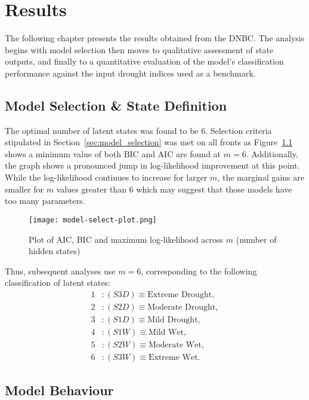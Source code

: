 \graphicspath{{results/fig/}}

\chapter{Results}
\label{chap:results}

The following chapter presents the results obtained from the DNBC. The analysis begins with model selection then moves to qualitative assessment of state outputs, and finally to a quantitative evaluation of the model’s classification performance against the input drought indices used as a benchmark.

\section{Model Selection \& State Definition}

The optimal number of latent states was found to be $6$. Selection criteria stipulated in Section~\ref{sec:model_selection} was met on all fronts as Figure~\ref{fig:model-select-plot} shows a minimum value of both BIC and AIC are found at $m=6$. Additionally, the graph shows a pronounced jump in log-likelihood improvement at this point. While the log-likelihood continues to increase for larger $m$, the marginal gains are smaller for $m$ values greater than $6$ which may suggest that those models have too many parameters. 

\begin{figure}[!h]
    \centering
    \texttt{[image: model-select-plot.png]}
    \caption[Model Selection Plot]{Plot of AIC, BIC and maximum log-likelihood across $m$ (number of hidden states)}
    \label{fig:model-select-plot}
\end{figure}

Thus, subsequent analyses use $m = 6$, corresponding to the following classification of latent states:
\[
\begin{aligned}
1 &: (S3D) \equiv \text{Extreme Drought}, \\
2 &: (S2D) \equiv \text{Moderate Drought}, \\
3 &: (S1D) \equiv \text{Mild Drought}, \\
4 &: (S1W) \equiv \text{Mild Wet}, \\
5 &: (S2W) \equiv \text{Moderate Wet}, \\
6 &: (S3W) \equiv \text{Extreme Wet.}
\end{aligned}
\]

\section{Model Behaviour}

